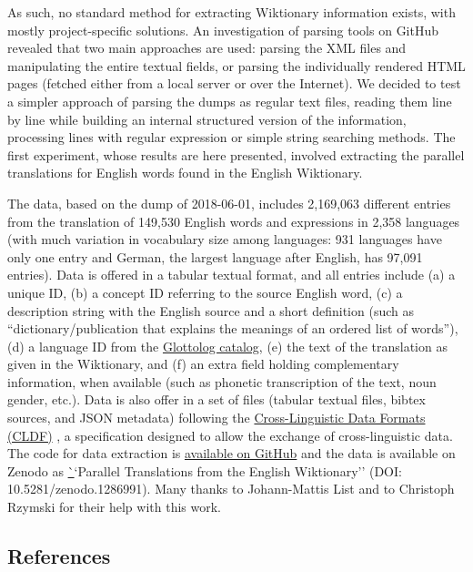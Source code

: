 \documentclass[
  english,
  a4paper,
  oneside,tablecaptionabove
]{scrbook}
\begin{document}
As such, no standard method for extracting Wiktionary information
exists, with mostly project-specific solutions. An investigation of
parsing tools on GitHub revealed that two main approaches are used:
parsing the XML files and manipulating the entire textual fields, or
parsing the individually rendered HTML pages (fetched either from a
local server or over the Internet). We decided to test a simpler
approach of parsing the dumps as regular text files, reading them line
by line while building an internal structured version of the
information, processing lines with regular expression or simple string
searching methods. The first experiment, whose results are here
presented, involved extracting the parallel translations for English
words found in the English Wiktionary.

The data, based on the dump of 2018-06-01, includes 2,169,063 different
entries from the translation of 149,530 English words and expressions in
2,358 languages (with much variation in vocabulary size among languages:
931 languages have only one entry and German, the largest language after
English, has 97,091 entries). Data is offered in a tabular textual
format, and all entries include (a) a unique ID, (b) a concept ID
referring to the source English word, (c) a description string with the
English source and a short definition (such as ``dictionary/publication
that explains the meanings of an ordered list of words''), (d)
a language ID from the \href{http://glottolog.org}{Glottolog catalog},
(e) the text of the translation as given in the Wiktionary, and (f) an
extra field holding complementary information, when available (such as
phonetic transcription of the text, noun gender, etc.). Data is also
offer in a set of files (tabular textual files, bibtex sources, and JSON
metadata) following the \href{http://cldf.clld.org}{Cross-Linguistic
Data Formats (CLDF)} , a specification designed to allow the exchange of
cross-linguistic data. The code for data extraction is
\href{https://github.com/tresoldi/wiktionary_parser}{available on
GitHub} and the data is available on Zenodo as
\href{https://zenodo.org/record/1286991}``Parallel Translations from the
English Wiktionary'' (DOI: 10.5281/zenodo.1286991). Many thanks to
Johann-Mattis List and to Christoph Rzymski for their help with this
work.

\hypertarget{references}{\subsection*{References}\label{references}}
\end{document}
